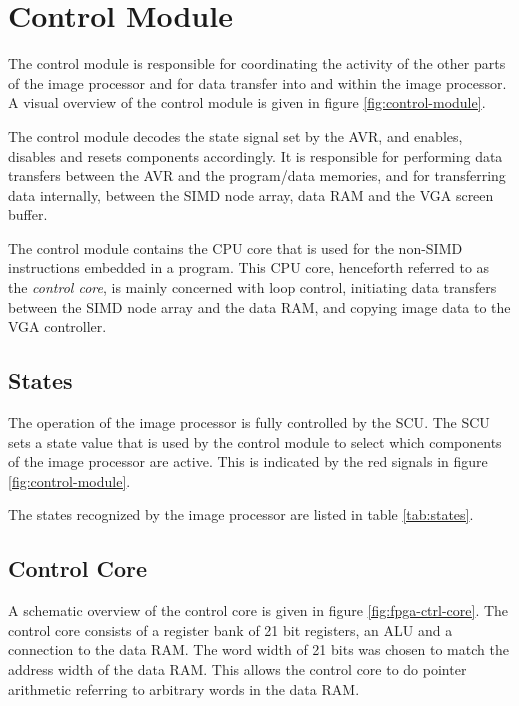 \section{Control Module}

The control module is responsible for coordinating the activity of the
other parts of the image processor and for data transfer into and within
the image processor. A visual overview of the control module is given in
figure \ref{fig:control-module}.



The control module decodes the state signal set by the AVR, and enables,
disables and resets components accordingly. It is responsible for performing
data transfers between the AVR and the program/data memories, and for
transferring data internally, between the \ac{SIMD} node array, data \ac{RAM}
and the \ac{VGA} screen buffer.

The control module contains the \ac{CPU} core that is used for the non-\ac{SIMD}
instructions embedded in a program. This \ac{CPU} core, henceforth referred to
as the \emph{control core}, is mainly concerned with loop control, initiating
data transfers between the \ac{SIMD} node array and the data RAM, and copying
image data to the \ac{VGA} controller.

\subsection{States}

The operation of the image processor is fully controlled by the \ac{SCU}. The
\ac{SCU} sets a state value that is used by the control module to select which
components of the image processor are active. This is indicated by the red
signals in figure \ref{fig:control-module}.

The states recognized by the image processor are listed in table
\ref{tab:states}.



\subsection{Control Core}

A schematic overview of the control core is given in figure
\ref{fig:fpga-ctrl-core}. The control core consists of a register bank
of 21 bit registers, an \ac{ALU} and a connection to the data \ac{RAM}. The word
width of 21 bits was chosen to match the address width of the data \ac{RAM}.
This allows the control core to do pointer arithmetic referring to
arbitrary words in the data \ac{RAM}.

